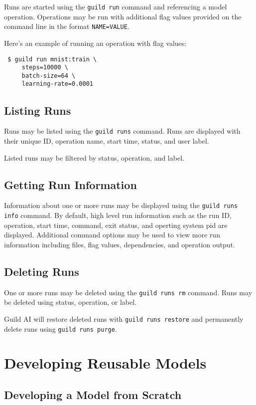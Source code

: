 \documentclass{article}
\begin{document}
Runs are started using the \verb|guild run| command and referencing a
model operation. Operations may be run with additional flag values
provided on the command line in the format \verb|NAME=VALUE|.

Here's an example of running an operation with flag values:

{\footnotesize
\begin{verbatim}
 $ guild run mnist:train \
     steps=10000 \
     batch-size=64 \
     learning-rate=0.0001
\end{verbatim}}

\subsection{Listing Runs}

Runs may be listed using the \verb|guild runs| command. Runs are
displayed with their unique ID, operation name, start time, status,
and user label.

Listed runs may be filtered by status, operation, and label.

\subsection{Getting Run Information}

Information about one or more runs may be displayed using the
\verb|guild runs info| command. By default, high level run information
such as the run ID, operation, start time, command, exit status, and
operting system pid are displayed. Additional command options may be
used to view more run information including files, flag values,
dependencies, and operation output.

\subsection{Deleting Runs}

One or more runs may be deleted using the \verb|guild runs rm|
command. Runs may be deleted using status, operation, or label.

Guild AI will restore deleted runs with \verb|guild runs restore| and
permanently delete runs using \verb|guild runs purge|.

\section{Developing Reusable Models}

\subsection{Developing a Model from Scratch}
\end{document}
